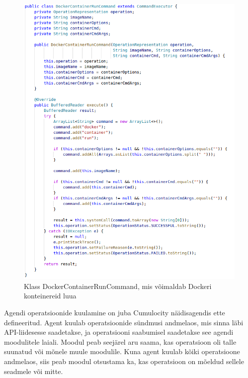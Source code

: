 \documentclass[12pt]{article}
\begin{document}
  \FloatBarrier
 
 
  \begin{figure} [ht] %
  \begin{center}
  \includegraphics[width=1.0\textwidth]{dockerdriver_dockercontainerruncommand}
  \caption{Klass DockerContainerRunCommand, mis võimaldab Dockeri konteinereid luua}
  \label{fig:dockerdriver_dockercontainerruncommand}
  \end{center}
  \end{figure}
  
  \FloatBarrier
 
 
  Agendi operatsioonide kuulamine on juba Cumulocity näidisagendis ette defineeritud.
  Agent kuulab operatsioonide sündmusi andmelaos, mis sinna läbi API-liidesesse
  saadetakse, ja operatsiooni
  saabumisel saadetakse see agendi moodulitele laiali. Moodul peab seejärel aru
  saama, kas operatsioon oli talle suunatud või mõnele muule moodulile. Kuna
  agent kuulab kõiki operatsioone andmelaos, siis peab moodul otsustama ka,
  kas operatsioon on mõeldud sellele seadmele või mitte.
 
\end{document}
